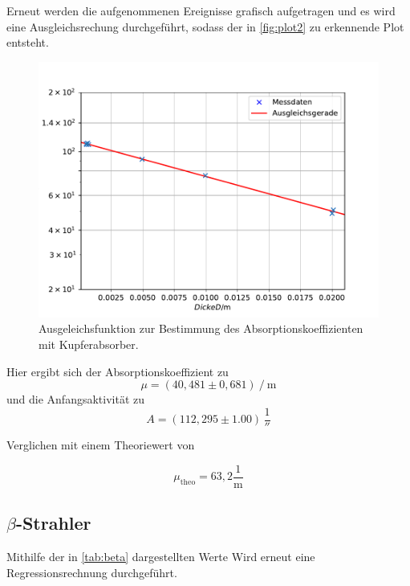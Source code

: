   Erneut werden die aufgenommenen Ereignisse grafisch aufgetragen und es wird eine Ausgleichsrechung durchgeführt, sodass der in \autoref{fig:plot2} zu erkennende Plot entsteht.

  \begin{figure}[H]
      \centering
      \includegraphics{figures/GammaKupfer2.pdf}
      \caption{Ausgeleichsfunktion zur Bestimmung des Absorptionskoeffizienten mit Kupferabsorber.}
      \label{fig:plot2}
  \end{figure}

Hier ergibt sich der Absorptionskoeffizient zu
\begin{equation*}
    \mu =  \left(40,481 \pm 0,681\right) \mathbin{/} \unit{\meter}
\end{equation*}
und die Anfangsaktivität zu
\begin{equation*}
    A = (112,295 \pm 1.00) \, \unit{\frac{1}{\second}}
\end{equation*}

Verglichen mit einem Theoriewert von %

\begin{equation*}
    \mu_{\text{theo}} = 63,2  \dfrac{1}{\unit{\meter}} %
\end{equation*}

\subsection*{$\beta$-Strahler}

Mithilfe der in \autoref{tab:beta} dargestellten Werte Wird erneut eine Regressionsrechnung durchgeführt. 

